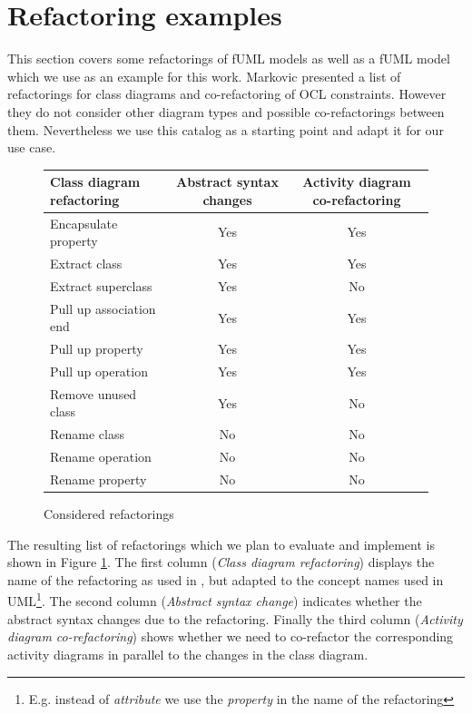 \documentclass{llncs}
\begin{document}


\section{Refactoring examples}
\label{refactoring-examples}

This section covers some refactorings of fUML models as well as a fUML model which we use as an example for this work. 
Markovic \cite{DBLP:journals/sosym/MarkovicB08} presented a list of refactorings for class 
diagrams and co-refactoring of OCL constraints. However they do not consider other diagram types and possible co-refactorings between 
them. Nevertheless we use this catalog as a starting point and adapt it for our use case. 

\begin{figure}[h!t]
 \centering
 \begin{tabular}[]{l | c | c}
  Class diagram refactoring & Abstract syntax changes & Activity diagram co-refactoring\\
  \hline
  Encapsulate property & Yes & Yes\\
  Extract class & Yes & Yes\\
  Extract superclass & Yes & No\\
  Pull up association end & Yes & Yes\\
  Pull up property & Yes & Yes\\
  Pull up operation & Yes & Yes\\
  Remove unused class & Yes & No\\
  Rename class & No & No\\
  Rename operation & No & No\\
  Rename property & No & No\\
 \end{tabular}
 \caption{Considered refactorings}
 \label{fig:refactoringlist}
\end{figure}

The resulting list of 
refactorings which we plan to evaluate and implement is shown in Figure \ref{fig:refactoringlist}. 
The first column (\textit{Class diagram refactoring}) displays the name of the refactoring as used in \cite{DBLP:journals/sosym/MarkovicB08}, but adapted to the 
concept names used in UML\footnote{E.g. instead of \textit{attribute} we use the \textit{property} in the name of the refactoring}. 
The second column (\textit{Abstract syntax change}) indicates whether the abstract syntax changes due to the refactoring.
Finally the third column (\textit{Activity diagram co-refactoring}) shows whether we need to co-refactor the corresponding activity diagrams 
in parallel to the changes in the class diagram.
\end{document}
